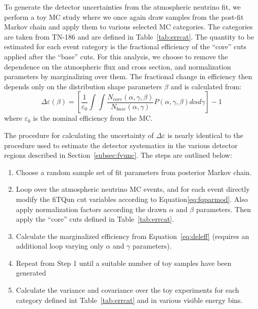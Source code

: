 To generate the detector uncertainties from the atmospheric neutrino fit, we
perform a toy MC study where we once again draw samples from the post-fit Markov
chain and apply them to various selected MC categories.  The categories are
taken from TN-186 and are defined in Table~\ref{tab:errcat}. The quantity to
be estimated for each event category is the fractional efficiency of the ``core''
cuts applied after the ``base'' cuts.  For this analysis, we choose to remove the 
dependence on the atmospheric flux and cross section, and normalization parameters by 
marginalizing over them.  The fractional change in efficiency then depends only
on the distribution shape parameters $\beta$ and is calculated from:
%
\begin{equation}
  \label{eq:deleff}
  \Delta \varepsilon(\beta) = \left[ \frac{1}{\varepsilon_{0}}
  \int\int\frac{N_{core}(\alpha,\gamma,\beta)}{N_{base}(\alpha,\gamma)}
  P(\alpha,\gamma,\beta)d\alpha d\gamma \right] - 1
\end{equation}
%
where $\varepsilon_{0}$ is the nominal efficiency from the MC.

The procedure for calculating the uncertainty of $\Delta \varepsilon$ is nearly
identical to the procedure used to estimate the detector systematics in the various
detector regions described in Section~\ref{subsec:fvunc}. The steps are outlined
below:

\begin{enumerate}
  \item Choose a random sample set of fit parameters from posterior Markov chain.
  \item Loop over the atmospheric neutrino MC events, and for each event directly modify the fiTQun cut variables
    according to Equation\ref{eq:fqparmod}. Also apply normalization factors according the drawn $\alpha$ and
    $\beta$ parameters.  Then apply the ``core'' cuts defined in Table~\ref{tab:errcat}.
  \item Calculate the marginalized efficiency from Equation~\ref{eq:deleff} (requires an additional
    loop varying only $\alpha$ and $\gamma$ parameters).
  \item Repeat from Step 1 until a suitable number of toy samples have been generated
  \item Calculate the variance and covariance over the toy experiments for each category defined
    int Table~\ref{tab:errcat} and in various visible energy bins.
\end{enumerate}

